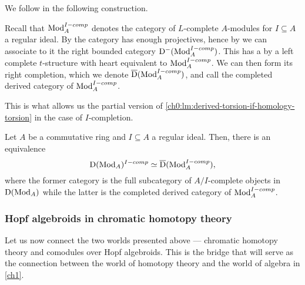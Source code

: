 We follow \cite{barthel-heard-valenzuela_2020} in the following construction. 

\begin{construction}
    \label{ch0:const:completed-derived-category}
    Recall that $\mathrm{Mod}_A^{I-comp}$ denotes the category of $L$-complete $A$-modules for $I\subseteq A$ a regular ideal. By \cite[2.11]{barthel-heard-valenzuela_2020} the category has enough projectives, hence by \cite[1.3.2]{Lurie_HA} we can associate to it the right bounded category $\mathrm{D}^-(\mathrm{Mod}_A^{I-comp})$. This has a by \cite[1.3.2.19, 1.3.3.16]{Lurie_HA} a left complete $t$-structure with heart equivalent to $\mathrm{Mod}_A^{I-comp}$. We can then form its right completion, which we denote $\overline{\mathrm{D}}(\mathrm{Mod}_A^{I-comp})$, and call the completed derived category of $\mathrm{Mod}_A^{I-comp}$. 
\end{construction}

This is what allows us the partial version of \cref{ch0:lm:derived-torsion-if-homology-torsion} in the case of $I$-completion. 

\begin{proposition}
    \label{ch0:prop:pulling-out-completion}
    Let $A$ be a commutative ring and $I\subseteq A$ a regular ideal. Then, there is an equivalence 
    \[\mathrm{D}(\mathrm{Mod}_A)^{I-comp}\simeq \overline{\mathrm{D}}(\mathrm{Mod}_A^{I-comp}),\]
    where the former category is the full subcategory of $A/I$-complete objects in $\mathrm{D}(\mathrm{Mod}_A)$ while the latter is the completed derived category of $\mathrm{Mod}_A^{I-comp}$. 
\end{proposition}








\subsubsection{Hopf algebroids in chromatic homotopy theory}

Let us now connect the two worlds presented above --- chromatic homotopy theory and comodules over Hopf algebroids. This is the bridge that will serve as the connection between the world of homotopy theory and the world of algebra in \cref{ch1}. 

